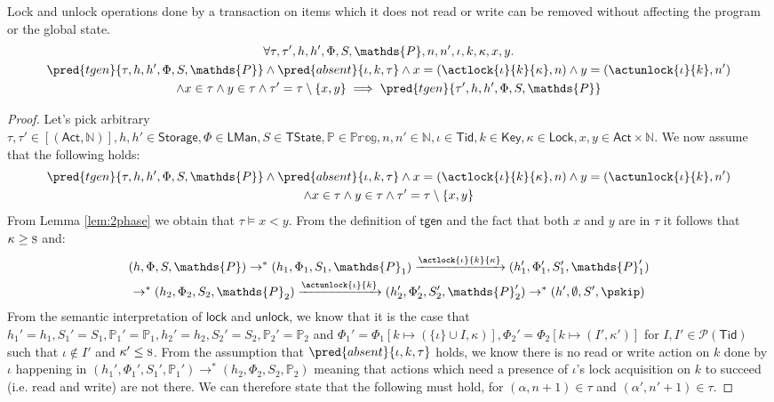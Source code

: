 \lem Lock and unlock operations done by a transaction on items which it does not read or write can be removed without affecting the program or the global state.
\begin{gather*}
	\forall \tau, \tau', h, h', \Phi, S, \mathds{P}, n, n', \iota, k, \kappa, x, y \ldotp
		\\
	\pred{tgen}{\tau, h, h', \Phi, S, \mathds{P}} \land  \pred{absent}{\iota, k, \tau} \land x = (\actlock{\iota}{k}{\kappa}, n) \land y = (\actunlock{\iota}{k}, n') \\ \land x \in \tau \land y \in \tau
	\land \tau' = \tau \setminus \{ x, y \}
		\implies
	\pred{tgen}{\tau', h, h', \Phi, S, \mathds{P}}
\end{gather*}
\begin{proof}
Let's pick arbitrary $\tau, \tau' \in [(\mathsf{Act}, \mathds{N})], h, h' \in \mathsf{Storage}, \Phi \in \mathsf{LMan}, S \in \mathsf{TState}, \mathds{P} \in \mathds{Prog}, n, n' \in \mathds{N}, \iota \in \mathsf{Tid}, k \in \mathsf{Key}, \kappa \in \mathsf{Lock}, x, y \in \mathsf{Act} \times \mathds{N}$. We now assume that the following holds:
\begin{gather*}
	\pred{tgen}{\tau, h, h', \Phi, S, \mathds{P}} \land  \pred{absent}{\iota, k, \tau} \land x = (\actlock{\iota}{k}{\kappa}, n) \land y = (\actunlock{\iota}{k}, n') \\ \land x \in \tau \land y \in \tau
	\land \tau' = \tau \setminus \{ x, y \}
\end{gather*}
From Lemma \ref{lem:2phase} we obtain that $\tau \vDash x < y$. From the definition of $\mathsf{tgen}$ and the fact that both $x$ and $y$ are in $\tau$ it follows that $\kappa \geq \textsc{s}$ and:
\begin{gather}
	(h, \Phi, S, \mathds{P}) \rightarrow^* (h_1, \Phi_1, S_1, \mathds{P}_1) \xrightarrow{\actlock{\iota}{k}{\kappa}} (h_1', \Phi_1', S_1', \mathds{P}_1') \\ \rightarrow^* (h_2, \Phi_2, S_2, \mathds{P}_2) \xrightarrow{\actunlock{\iota}{k}} (h_2', \Phi_2', S_2', \mathds{P}_2') \rightarrow^* (h', \emptyset, S', \pskip)
\end{gather}
From the semantic interpretation of $\mathsf{lock}$ and $\mathsf{unlock}$, we know that it is the case that $h_1' = h_1, S_1' = S_1, \mathds{P}_1' = \mathds{P}_1, h_2' = h_2, S_2' = S_2, \mathds{P}_2' = \mathds{P}_2$ and $\Phi_1' = \Phi_1[k \mapsto (\{\iota\} \cup I, \kappa)], \Phi_2' = \Phi_2[k \mapsto (I', \kappa')]$ for $I, I' \in \mathcal{P}(\mathsf{Tid})$ such that $\iota \not\in I'$ and $\kappa' \leq \textsc{s}$. From the assumption that $\pred{absent}{\iota, k, \tau}$ holds, we know there is no read or write action on $k$ done by $\iota$ happening in $(h_1', \Phi_1', S_1', \mathds{P}_1') \rightarrow^* (h_2, \Phi_2, S_2, \mathds{P}_2)$ meaning that actions which need a presence of $\iota$'s lock acquisition on $k$ to succeed (i.e. read and write) are not there. We can therefore state that the following must hold, for $(\alpha, n+1) \in \tau$ and $(\alpha', n'+1) \in \tau$.

\end{proof}
